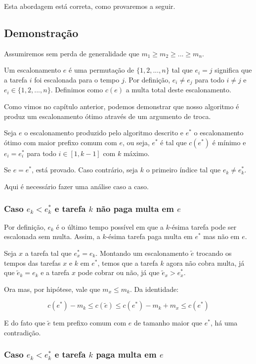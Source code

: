 Esta abordagem está correta, como provaremos a seguir.

\subsection*{Demonstração}

Assumiremos sem perda de generalidade que $m_1 \geq m_2 \geq ... \geq m_n$.

Um escalonamento $e$ é uma permutação de $\{1, 2, ..., n\}$ tal que $e_i = j$ significa que a tarefa $i$ foi escalonada para o tempo $j$. Por definição, $e_i \neq e_j$ para todo $i \neq j$ e $e_i \in \{1, 2, ..., n\}$. Definimos como $c(e)$ a multa total deste escalonamento.

Como vimos no capítulo anterior, podemos demonstrar que nosso algoritmo é produz um escalonamento ótimo através de um argumento de troca.

Seja $e$ o escalonamento produzido pelo algoritmo descrito e $e^*$ o escalonamento ótimo com maior prefixo comum com $e$, ou seja, $e^*$ é tal que $c(e^*)$ é mínimo e $e_i = e^*_i$ para todo $i \in [1, k - 1]$ com $k$ máximo.

Se $e = e^*$, está provado. Caso contrário, seja $k$ o primeiro índice tal que $e_k \neq e^*_k$.

Aqui é necessário fazer uma análise caso a caso.

\subsubsection*{Caso $e_k < e^*_k$ e tarefa $k$ não paga multa em $e$}

Por definição, $e_k$ é o último tempo possível em que a $k$-ésima tarefa pode ser escalonada sem multa. Assim, a $k$-ésima tarefa paga multa em $e^*$ mas não em $e$.

Seja $x$ a tarefa tal que $e^*_x = e_k$. Montando um escalonamento $\widetilde{e}$ trocando os tempos das tarefas $x$ e $k$ em $e^*$, temos que a tarefa $k$ agora não cobra multa, já que $\widetilde{e}_k = e_k$ e a tarefa $x$ pode cobrar ou não, já que $\widetilde{e}_x > e^*_x$.

Ora mas, por hipótese, vale que $m_x \leq m_k$. Da identidade:

$$c(e^*) - m_k \leq c(\widetilde{e}) \leq c(e^*) - m_k + m_x \leq c(e^*)$$

E do fato que $\widetilde{e}$ tem prefixo comum com $e$ de tamanho maior que $e^*$, há uma contradição.

\subsubsection*{Caso $e_k < e^*_k$ e tarefa $k$ paga multa em $e$}

